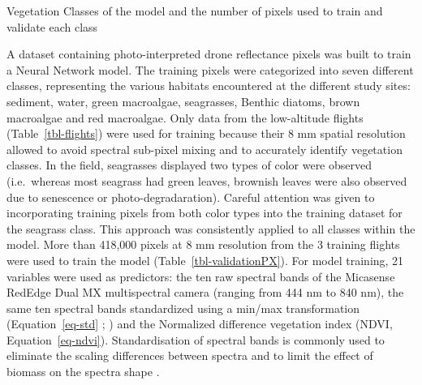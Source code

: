 \documentclass[
  number]{elsarticle}
\begin{document}
\begin{table}

\caption{\label{tbl-validationPX}Vegetation Classes of the model and the
number of pixels used to train and validate each class}


\end{table}%

A dataset containing photo-interpreted drone reflectance pixels was
built to train a Neural Network model. The training pixels were
categorized into seven different classes, representing the various
habitats encountered at the different study sites: sediment, water,
green macroalgae, seagrasses, Benthic diatoms, brown macroalgae and red
macroalgae. Only data from the low-altitude flights
(Table~\ref{tbl-flights}) were used for training because their 8 mm
spatial resolution allowed to avoid spectral sub-pixel mixing and to
accurately identify vegetation classes. In the field, seagrasses
displayed two types of color were observed (i.e.~whereas most seagrass
had green leaves, brownish leaves were also observed due to senescence
or photo-degradaration). Careful attention was given to incorporating
training pixels from both color types into the training dataset for the
seagrass class. This approach was consistently applied to all classes
within the model. More than 418,000 pixels at 8 mm resolution from the 3
training flights were used to train the model
(Table~\ref{tbl-validationPX}). For model training, 21 variables were
used as predictors: the ten raw spectral bands of the Micasense RedEdge
Dual MX multispectral camera (ranging from 444 nm to 840 nm), the same
ten spectral bands standardized using a min/max transformation
(Equation~\ref{eq-std} ; \citep{Cao2017}) and the Normalized difference
vegetation index (NDVI, Equation~\ref{eq-ndvi}). Standardisation of
spectral bands is commonly used to eliminate the scaling differences
between spectra and to limit the effect of biomass on the spectra shape
\citep{Douay2022, Davies2023}.
\end{document}
